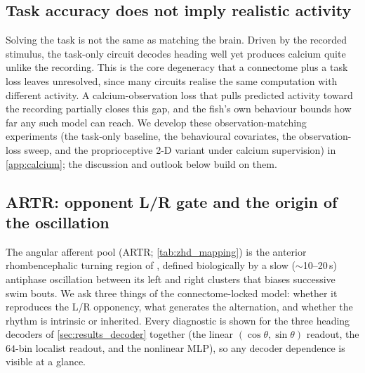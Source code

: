 \documentclass[11pt]{article}
\begin{document}
\subsection{Task accuracy does not imply realistic activity}
\label{sec:results_task_vs_activity}
Solving the task is not the same as matching the brain. Driven by the
recorded stimulus, the task-only circuit decodes heading well yet produces
calcium quite unlike the recording. This is the core degeneracy that a
connectome plus a task loss leaves unresolved, since many circuits realise
the same computation with different activity. A calcium-observation loss
that pulls predicted activity toward the recording partially closes this
gap, and the fish's own behaviour bounds how far any such model can reach.
We develop these observation-matching experiments (the task-only
baseline, the behavioural covariates, the observation-loss sweep, and the
proprioceptive 2-D variant under calcium supervision) in
\cref{app:calcium}; the discussion and outlook below build on them.


\subsection{ARTR: opponent L/R gate and the origin of the oscillation}
\label{sec:results_artr}

The angular afferent pool (ARTR; \cref{tab:zhd_mapping}) is the anterior
rhombencephalic turning region of \citet{dunn2016artr}, defined biologically
by a slow ($\sim$10--20\,s) antiphase oscillation between its left and right
clusters that biases successive swim bouts. We ask three things of the
connectome-locked model: whether it reproduces the L/R opponency, what
generates the alternation, and whether the rhythm is intrinsic or inherited.
Every diagnostic is shown for the three heading decoders of
\cref{sec:results_decoder} together (the linear
$(\cos\theta,\sin\theta)$ readout, the $64$-bin localist readout, and the
nonlinear MLP), so any decoder dependence is visible at a glance.
\end{document}
